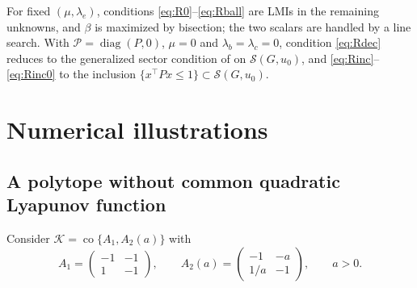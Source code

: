 \documentclass[preprint,12pt,authoryear]{elsarticle}
\theoremstyle{definition}
\theoremstyle{remark}
\newcommand{\tr}{^{\top}}
\newcommand{\PP}{\mathcal{P}}
\newcommand{\KK}{\mathcal{K}}
\DeclareMathOperator{\co}{co}
\DeclareMathOperator{\diag}{diag}
\begin{document}
For fixed $(\mu,\lambda_e)$, conditions \eqref{eq:R0}--\eqref{eq:Rball} are LMIs in the remaining unknowns, and $\beta$ is maximized by bisection; the two scalars are handled by a line search. With $\PP=\diag(P,0)$, $\mu=0$ and $\lambda_b=\lambda_c=0$, condition \eqref{eq:Rdec} reduces to the generalized sector condition of \citet{GomesdaSilva2005} on $\mathcal S(G,u_0)$, and \eqref{eq:Rinc}--\eqref{eq:Rinc0} to the inclusion $\{x\tr Px\le1\}\subset\mathcal S(G,u_0)$.

\section{Numerical illustrations}\label{sec:num}

\subsection{A polytope without common quadratic Lyapunov function}\label{sec:numpoly}
Consider $\KK=\co\{A_1,A_2(a)\}$ with
\begin{equation}\label{eq:SN}
A_1=\begin{pmatrix}-1&-1\\1&-1\end{pmatrix},\qquad A_2(a)=\begin{pmatrix}-1&-a\\1/a&-1\end{pmatrix},\qquad a>0 .
\end{equation}
\end{document}
